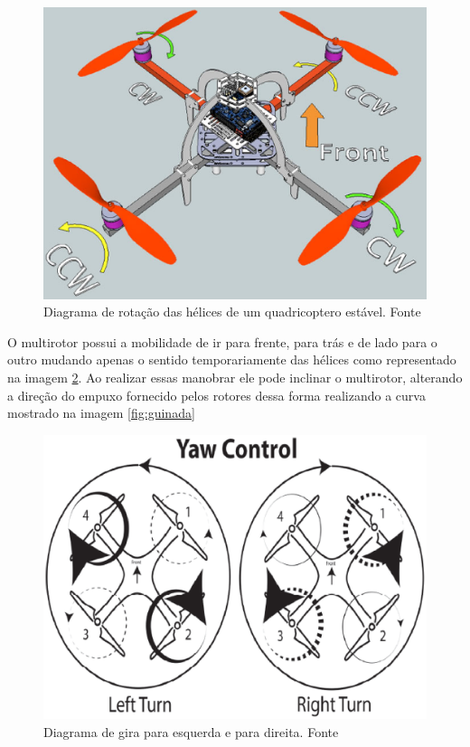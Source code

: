 \begin{figure}[H]
    \centering
      \includegraphics[keepaspectratio=true,scale=0.5]{figuras/rotacao.eps}
    \caption[Diagrama  de rotação das hélices de um quadricoptero estável]{Diagrama  de rotação das hélices de um quadricoptero estável. Fonte \cite{audronis}}
    \label{fig:rotacao}
\end{figure}

O multirotor possui a mobilidade de ir para frente, para trás e de lado para o outro mudando apenas o sentido temporariamente das hélices como representado na imagem \ref{fig:gira}. Ao realizar essas manobrar ele pode inclinar o multirotor, alterando a direção do empuxo fornecido pelos rotores dessa forma realizando a curva mostrado na imagem \ref{fig:guinada}

\begin{figure}[H]
    \centering
      \includegraphics[keepaspectratio=true,scale=0.5]{figuras/gira.eps}
    \caption{Diagrama de gira para esquerda e para direita. Fonte \cite{audronis}}
    \label{fig:gira}
\end{figure}

